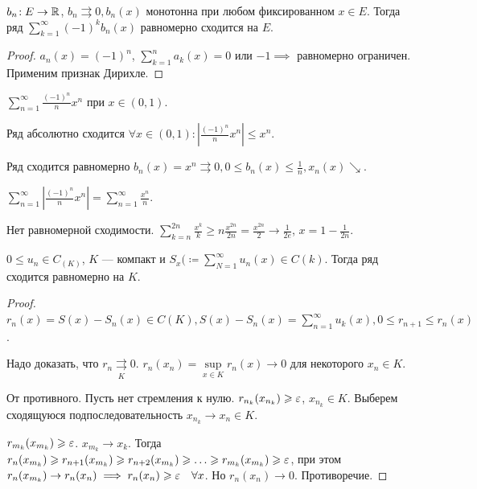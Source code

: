 \begin{theorem}
    $b_n\!: E \to \mathbb{R}$,  $b_n \rightrightarrows 0, b_n(x)$ монотонна при любом фиксированном  $x \in E$. Тогда ряд  $\sum\limits_{k=1}^\infty (-1)^k b_n(x)$ равномерно сходится на  $E$.
\end{theorem}
\begin{proof}
    $a_n(x) = (-1)^n$,  $\sum\limits_{k=1}^n a_k(x) = 0$ или  $-1  \implies $ равномерно ограничен. Применим признак Дирихле.
\end{proof}
\begin{example}
    $\sum\limits_{n=1}^\infty \frac{(-1)^n}{n}x^n$ при $x \in (0, 1)$.

    Ряд абсолютно сходится $\forall x \in (0, 1)\!: \left| \frac{(-1)^n}{n}x^n\right| \le x^n$.

    Ряд сходится равномерно $b_n(x) = x^n \rightrightarrows 0, 0 \le b_n(x) \le \frac{1}{n}, x_n(x) \searrow$.

    $\sum\limits_{n=1}^\infty \left|\frac{(-1)^n}{n}x^n \right| = \sum\limits_{n=1}^\infty \frac{x^n}{n}$.

    Нет равномерной сходимости. $\sum\limits_{k=n}^{2n} \frac{x^k}{k} \ge n \frac{x^{2n}}{2n} = \frac{x^{2n}}{2} \to \frac{1}{2e}$, $x = 1 - \frac{1}{2n}$.
\end{example}
\begin{theorem}
    $0 \le u_n \in C_(K)$, $K$ --- компакт и  $S_x( \coloneqq \sum\limits_{N=1}^\infty u_n(x) \in C(k)$. Тогда ряд сходится равномерно на  $K$.
\end{theorem}
\begin{proof}
    $r_n(x) = S(x) - S_n(x) \in C(K), S(x) - S_n(x) = \sum\limits_{n=1}^\infty u_k(x), 0 \le r_{n+1} \le r_n(x)$.

    Надо доказать, что $r_n \underset{K}{\rightrightarrows} 0$.  $r_n(x_n) = \sup\limits_{x \in K} r_n(x) \to 0$ для некоторого $x_n \in K$.

    От противного. Пусть нет стремления к нулю.  $r_{n_k}(x_{n_k}) \geqslant \varepsilon$, $x_{n_k} \in K$. Выберем сходящуюся подпоследовательность  $x_{n_k} \to x_n \in K$.

     $r_{m_k}(x_{m_k}) \geqslant \varepsilon$. $x_{m_k} \to x_k$. Тогда  $r_n(x_{m_k}) \geqslant r_{n+1}(x_{m_k}) \geqslant r_{n+2}(x_{m_k}) \geqslant \ldots \geqslant r_{m_k}(x_{m_k}) \geqslant \varepsilon$, при этом $r_n(x_{m_k}) \to r_n(x_n) \implies r_n(x_n) \geqslant \varepsilon \quad \forall x$. Но $r_n(x_n) \to 0$. Противоречие.
\end{proof}
